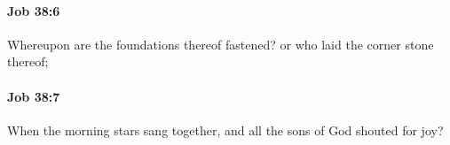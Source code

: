 		\paragraph{Job 38:6} %
			\label{JOB-38-6}

			Whereupon are the foundations thereof fastened? or who laid the corner stone thereof;


		\paragraph{Job 38:7} %
			\label{JOB-38-7}

			When the morning stars sang together, and all the sons of God shouted for joy?


